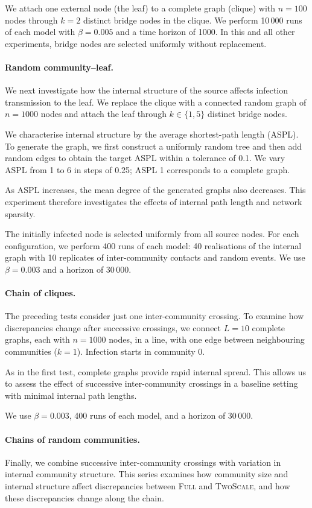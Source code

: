 \documentclass[a4paper,fleqn]{cas-sc}
\newcommand{\Full}{\textup{\textsc{Full}}}
\newcommand{\TS}{\textup{\textsc{TwoScale}}}
\begin{document}
We attach one external node (the leaf) to a complete graph (clique) with $n=100$ nodes through $k=2$ distinct bridge nodes in the clique. We perform 10\,000 runs of each model with $\beta=0.005$ and a time horizon of 1000. In this and all other experiments, bridge nodes are selected uniformly without replacement.

\paragraph{Random community--leaf.}
We next investigate how the internal structure of the source affects infection transmission to the leaf. We replace the clique with a connected random graph of $n=1000$ nodes and attach the leaf through $k\in\{1,5\}$ distinct bridge nodes.

We characterise internal structure by the average shortest-path length (ASPL). To generate the graph, we first construct a uniformly random tree and then add random edges to obtain the target ASPL within a tolerance of 0.1. We vary ASPL from 1 to 6 in steps of 0.25; ASPL 1 corresponds to a complete graph.

As ASPL increases, the mean degree of the generated graphs also decreases. This experiment therefore investigates the effects of internal path length and network sparsity.

The initially infected node is selected uniformly from all source nodes. For each configuration, we perform 400 runs of each model: 40 realisations of the internal graph with 10 replicates of inter-community contacts and random events. We use $\beta=0.003$ and a horizon of 30\,000.

\paragraph{Chain of cliques.}
The preceding tests consider just one inter-community crossing. To examine how discrepancies change after successive crossings, we connect $L=10$ complete graphs, each with $n=1000$ nodes, in a line, with one edge between neighbouring communities ($k=1$). Infection starts in community 0.

As in the first test, complete graphs provide rapid internal spread. This allows us to assess the effect of successive inter-community crossings in a baseline setting with minimal internal path lengths.

We use $\beta=0.003$, 400 runs of each model, and a horizon of 30\,000.

\paragraph{Chains of random communities.}
Finally, we combine successive inter-community crossings with variation in internal community structure. This series examines how community size and internal structure affect discrepancies between \Full{} and \TS{}, and how these discrepancies change along the chain.
\end{document}
